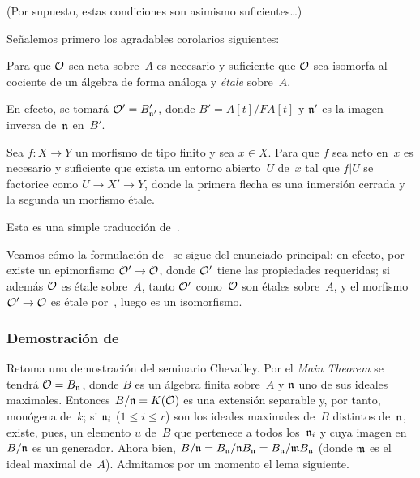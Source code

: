 (Por supuesto, estas condiciones son asimismo suficientes\ldots)

Señalemos primero los agradables corolarios siguientes:

\begin{corollaire}
\label{I.7.7}
Para que $\cal{O}$ sea neta sobre~$A$ es necesario y suficiente que $\cal{O}$ sea isomorfa al cociente de un álgebra de forma análoga y \emph{étale} sobre~$A$.
\end{corollaire}

En efecto, se tomará $\cal{O}'=B'_{\goth{n}'}$, donde $B'=A[t]/FA[t]$ y $\goth{n}'$ es la imagen inversa de~$\goth{n}$ en~$B'$.

\begin{corollaire}
\label{I.7.8}
Sea
$f\colon X\to Y$ un morfismo de tipo finito y sea $x\in X$. Para que $f$ sea neto en~$x$ es necesario y suficiente que exista un entorno abierto~$U$ de~$x$ tal que $f|U$ se factorice como $U\to X'\to Y$, donde la primera flecha es una inmersión cerrada y la segunda un morfismo étale.
\end{corollaire}

Esta es una simple traducción de~.

Veamos cómo la formulación de~ se sigue del enunciado principal: en efecto, por~ existe un epimorfismo $\cal{O}'\to\cal{O}$, donde $\cal{O}'$ tiene las propiedades requeridas;%
si además $\cal{O}$ es étale sobre~$A$, tanto $\cal{O}'$ como~$\cal{O}$ son étales sobre~$A$, y el morfismo $\cal{O}'\to\cal{O}$ es étale por~, luego es un isomorfismo.

\subsubsection*{Demostración de~}
Retoma una demostración del seminario Chevalley. Por el \emph{Main Theorem} se tendrá $\cal{O}=B_{\goth{n}}$, donde $B$ es un álgebra finita sobre~$A$ y $\goth{n}$ uno de sus ideales maximales. Entonces $B/\goth{n}=K(\cal{O})$ es una extensión separable y, por tanto, monógena de~$k$; si $\goth{n}_i$ ($1\leq i\leq r$) son los ideales maximales de~$B$ distintos de~$\goth{n}$, existe, pues, un elemento $u$ de~$B$ que pertenece a todos los~$\goth{n}_i$ y cuya imagen en~$B/\goth{n}$ es un generador. Ahora bien,
$B/\goth{n}=B_\goth{n}/\goth{n}B_\goth{n}=B_\goth{n}/\goth{m}B_\goth{n}$
(donde $\goth{m}$ es el ideal maximal de~$A$). Admitamos por un momento el lema siguiente.

